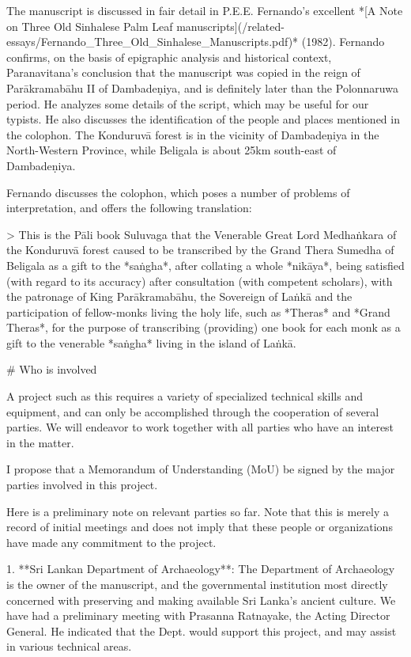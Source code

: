 \documentclass[11pt, openany,a5paper]{article}
\begin{document}
\begin{markdown}
The manuscript is discussed in fair detail in P.E.E. Fernando’s excellent *[A Note on Three Old Sinhalese Palm Leaf manuscripts](/related-essays/Fernando_Three_Old_Sinhalese_Manuscripts.pdf)* (1982). Fernando confirms, on the basis of epigraphic analysis and historical context, Paranavitana’s conclusion that the manuscript was copied in the reign of Parākramabāhu II of Dambadeṇiya, and is definitely later than the Polonnaruwa period. He analyzes some details of the script, which may be useful for our typists. He also discusses the identification of the people and places mentioned in the colophon. The Konduruvā forest is in the vicinity of Dambadeṇiya in the North-Western Province, while Beligala is about 25km south-east of Dambadeṇiya.

Fernando discusses the colophon, which poses a number of problems of interpretation, and offers the following translation:

> This is the Pāli book Suluvaga that the Venerable Great Lord Medhaṅkara of the Konduruvā forest caused to be transcribed by the Grand Thera Sumedha of Beligala as a gift to the *saṅgha*, after collating a whole *nikāya*, being satisfied (with regard to its accuracy) after consultation (with competent scholars), with the patronage of King Parākramabāhu, the Sovereign of Laṅkā and the participation of fellow-monks living the holy life, such as *Theras* and *Grand Theras*, for the purpose of transcribing (providing) one book for each monk as a gift to the venerable *saṅgha* living in the island of Laṅkā.

# Who is involved

A project such as this requires a variety of specialized technical skills and equipment, and can only be accomplished through the cooperation of several parties. We will endeavor to work together with all parties who have an interest in the matter.

I propose that a Memorandum of Understanding (MoU) be signed by the major parties involved in this project.

Here is a preliminary note on relevant parties so far. Note that this is merely a record of initial meetings and does not imply that these people or organizations have made any commitment to the project.

1. **Sri Lankan Department of Archaeology**: The Department of Archaeology is the owner of the manuscript, and the governmental institution most directly concerned with preserving and making available Sri Lanka’s ancient culture. We have had a preliminary meeting with Prasanna Ratnayake, the Acting Director General. He indicated that the Dept. would support this project, and may assist in various technical areas.


\end{markdown}
\end{document}
